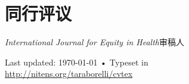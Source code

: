 \documentclass[11pt, a4paper]{article}
\begin{document}
\section*{同行评议}
\emph{International Journal for Equity in Health}审稿人

\vfill{}

\begin{center}
{\scriptsize  Last updated: \today\- •\- 
Typeset in \href{http://nitens.org/taraborelli/cvtex}{
\XeTeX }\\
\href{http://nitens.org/taraborelli/cvtex}{http://nitens.org/taraborelli/cvtex}}
\end{center}
\end{document}

